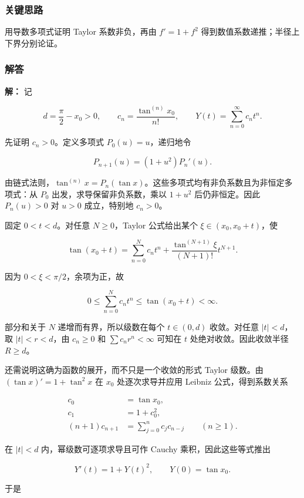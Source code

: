 \documentclass[11pt,a4paper]{article}
\begin{document}
\subsubsection{关键思路}\label{ux5173ux952eux601dux8def-28}

用导数多项式证明 Taylor 系数非负，再由 \(f\prime=1+f^2\)
得到数值系数递推；半径上下界分别论证。

\subsubsection{解答}\label{ux89e3ux7b54-28}

\textbf{解：} 记

\[
d=\frac\pi2-x_0>0,\qquad
c_n=\frac{\tan^{(n)}x_0}{n!},\qquad
Y(t)=\sum_{n=0}^{\infty}c_nt^n.
\]

先证明 \(c_n>0\)。定义多项式 \(P_0(u)=u\)，递归地令

\[
P_{n+1}(u)=(1+u^2)P_n'(u).
\]

由链式法则，\(\tan^{(n)}x=P_n(\tan x)\)。这些多项式均有非负系数且为非恒定多项式：从
\(P_0\) 出发，求导保留非负系数，乘以 \(1+u^2\) 后仍非恒定。因此
\(P_n(u)>0\) 对 \(u>0\) 成立，特别地 \(c_n>0\)。

固定 \(0<t<d\)。对任意 \(N\ge0\)，Taylor 公式给出某个
\(\xi\in(x_0,x_0+t)\)，使

\[
\tan(x_0+t)=\sum_{n=0}^Nc_nt^n
+\frac{\tan^{(N+1)}\xi}{(N+1)!}t^{N+1}.
\]

因为 \(0<\xi<\pi/2\)，余项为正，故

\[
0\le\sum_{n=0}^Nc_nt^n\le\tan(x_0+t)<\infty.
\]

部分和关于 \(N\) 递增而有界，所以级数在每个 \(t\in(0,d)\) 收敛。对任意
\(|t|<d\)，取 \(|t|<r<d\)，由 \(c_n\ge0\) 和 \(\sum c_nr^n<\infty\)
可知在 \(t\) 处绝对收敛。因此收敛半径 \(R\ge d\)。

还需说明这确为函数的展开，而不只是一个收敛的形式 Taylor 级数。由
\((\tan x)'=1+\tan^2x\) 在 \(x_0\) 处逐次求导并应用 Leibniz
公式，得到系数关系

\[
\begin{aligned}
c_0&=\tan x_0,\\
c_1&=1+c_0^2,\\
(n+1)c_{n+1}&=\sum_{j=0}^nc_jc_{n-j}\qquad(n\ge1).
\end{aligned}
\]

在 \(|t|<d\) 内，幂级数可逐项求导且可作 Cauchy 乘积，因此这些等式推出

\[
Y'(t)=1+Y(t)^2,\qquad Y(0)=\tan x_0.
\]

于是
\end{document}
